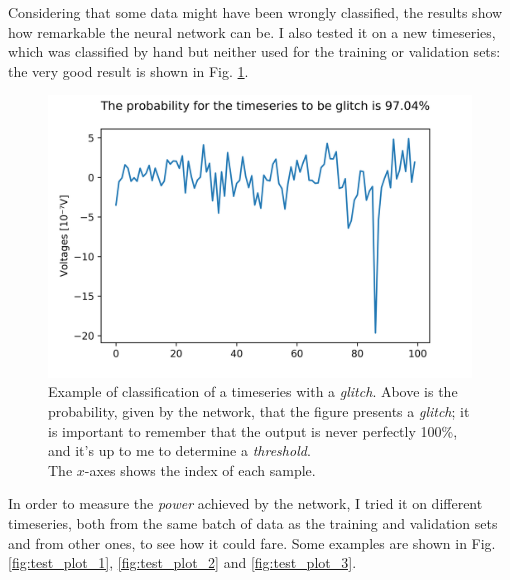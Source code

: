 \documentclass[12pt,a4paper,final]{book}			%
\begin{document}
			Considering that some data might have been wrongly classified, the results show how remarkable the neural network can be. 
			I also tested it on a new timeseries, which was classified by hand but neither used for the training or validation sets: the very good result is shown in Fig. \ref{fig:text_example}.
			\begin{figure}[h!]
			\centering
				\includegraphics[scale=0.6]{figures/test_example.png}
				\caption{Example of classification of a timeseries with a \textit{glitch}. Above is the probability, given by the network, that the figure presents a \textit{glitch}; it is important to remember that the output is never perfectly 100\%, and it's up to me to determine a \textit{threshold}.\\
				The $x$-axes shows the index of each sample.}
				\label{fig:text_example}
			\end{figure}			
			
			In order to measure the \textit{power} achieved by the network, I tried it on different timeseries, both from the same batch of data as the training and validation sets and from other ones, to see how it could fare. Some examples are shown in Fig. \ref{fig:test_plot_1}, \ref{fig:test_plot_2} and \ref{fig:test_plot_3}.
			
\end{document}
